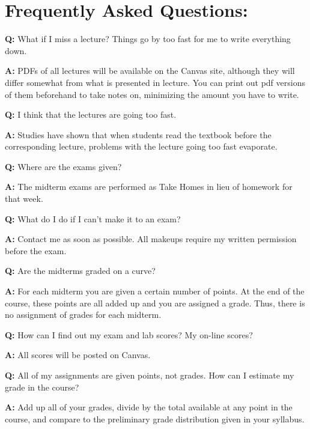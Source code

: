 \documentclass[12pt]{article}
\begin{document}
\section*{\centering Frequently Asked Questions:}

\setlength\parindent{0pt}

{\bf Q:} What if I miss a lecture? Things go by too fast for me to write everything down.

{\bf A:} PDFs of all lectures will be available on the Canvas site, although they will differ somewhat from what is presented in lecture.  You can print out pdf versions of them beforehand to take notes on, minimizing the amount you have to write.  %

\vspace{5mm}
{\bf Q:} I think that the lectures are going too fast.

{\bf A:} Studies have shown that when students read the textbook before the corresponding lecture, problems with the lecture going too fast evaporate.

\vspace{5mm}
{\bf Q:} Where are the exams given?

{\bf A:} The midterm exams are performed as Take Homes in lieu of homework for that week.

\vspace{5mm}

{\bf Q:} What do I do if I can't make it to an exam?

{\bf A:} Contact me as soon as possible. All makeups require my written permission before the exam.  

\vspace{5mm}

{\bf Q:} Are the midterms graded on a curve?

{\bf A:} For each midterm you are given a certain number of points. At the end of the course, these points are all added up and you are assigned a grade. Thus, there is no assignment of grades for each midterm.

\vspace{5mm}

{\bf Q:} How can I find out my exam and lab scores?  My on-line scores?

{\bf A:} All scores will be posted on Canvas.

\vspace{5mm}

{\bf Q:} All of my assignments are given points, not grades. How can I estimate my grade in the course?

{\bf A:} Add up all of your grades, divide by the total available at any point in the course, and compare to the preliminary grade distribution given in your syllabus.
\end{document}
